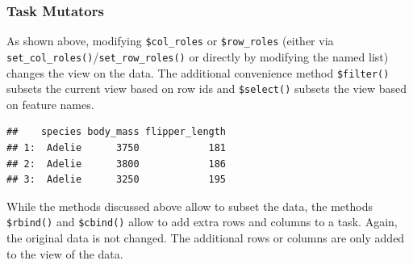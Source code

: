 \documentclass[
]{scrbook}
\newenvironment{Shaded}{\begin{snugshade}}{\end{snugshade}}
\newcommand{\AttributeTok}[1]{\textcolor[rgb]{0.77,0.63,0.00}{#1}}
\newcommand{\CommentTok}[1]{\textcolor[rgb]{0.56,0.35,0.01}{\textit{#1}}}
\newcommand{\DecValTok}[1]{\textcolor[rgb]{0.00,0.00,0.81}{#1}}
\newcommand{\FunctionTok}[1]{\textcolor[rgb]{0.00,0.00,0.00}{#1}}
\newcommand{\NormalTok}[1]{#1}
\newcommand{\OtherTok}[1]{\textcolor[rgb]{0.56,0.35,0.01}{#1}}
\newcommand{\SpecialCharTok}[1]{\textcolor[rgb]{0.00,0.00,0.00}{#1}}
\newcommand{\StringTok}[1]{\textcolor[rgb]{0.31,0.60,0.02}{#1}}
\renewenvironment{Shaded} {\begin{snugshade}\small} {\end{snugshade}}
\begin{document}
\hypertarget{tasks-mutators}{%
\subsubsection{Task Mutators}\label{tasks-mutators}}

As shown above, modifying \texttt{\$col\_roles} or \texttt{\$row\_roles} (either via \texttt{set\_col\_roles()}/\texttt{set\_row\_roles()} or directly by modifying the named list) changes the view on the data.
The additional convenience method \texttt{\$filter()} subsets the current view based on row ids and \texttt{\$select()} subsets the view based on feature names.

\begin{Shaded}
\end{Shaded}

\begin{verbatim}
##    species body_mass flipper_length
## 1:  Adelie      3750            181
## 2:  Adelie      3800            186
## 3:  Adelie      3250            195
\end{verbatim}

While the methods discussed above allow to subset the data, the methods \texttt{\$rbind()} and \texttt{\$cbind()} allow to add extra rows and columns to a task.
Again, the original data is not changed.
The additional rows or columns are only added to the view of the data.

\begin{Shaded}
\end{Shaded}
\end{document}
